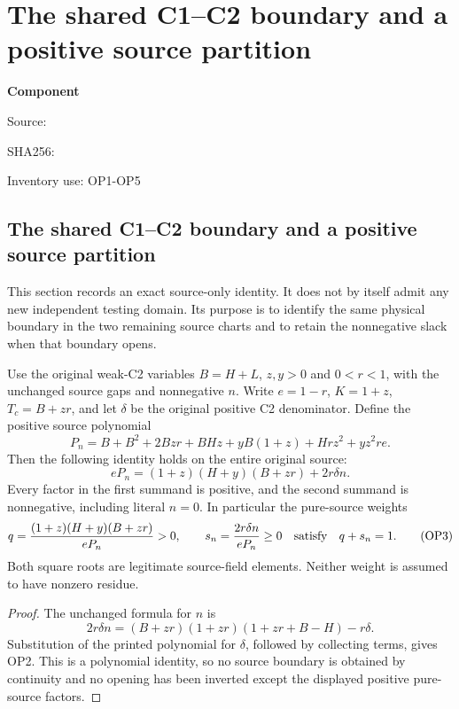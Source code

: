 \chapter{The shared C1--C2 boundary and a positive source partition}
\label{component:pc024f5300388}
\noindent\textbf{Component }\par
{\small\noindent Source: \par}
{\small\noindent SHA256: \par}
{\small\noindent Inventory use: OP1-OP5\par}
\medskip
\section{The shared C1--C2 boundary and a positive source partition}
\label{pc024f5300388:sec:r13-source-overlap}

This section records an exact source-only identity. It does not by itself
admit any new independent testing domain. Its purpose is to identify the
same physical boundary in the two remaining source charts and to retain
the nonnegative slack when that boundary opens.

Use the original weak-C2 variables $B=H+L$, $z,y>0$ and $0<r<1$,
with the unchanged source gaps and nonnegative $n$. Write $e=1-r$,
$K=1+z$, $T_c=B+zr$, and let $\delta$ be the original positive
C2 denominator. Define the positive source polynomial
\[
 P_n=B+B^2+2Bzr+BHz+yB(1+z)+Hrz^2+yz^2re.
 \tag{OP1}
\]
Then the following identity holds on the entire original source:
\[
 \boxed{\quad eP_n=(1+z)(H+y)(B+zr)+2r\delta n.\quad}
 \tag{OP2}
\]
Every factor in the first summand is positive, and the second summand
is nonnegative, including literal $n=0$. In particular the pure-source
weights
\[
 q={ (1+z)(H+y)(B+zr)\over eP_n}>0,
 \qquad s_n={2r\delta n\over eP_n}\ge0
 \quad\hbox{satisfy}\quad q+s_n=1.                   \tag{OP3}
\]
Both square roots are legitimate source-field elements. Neither weight
is assumed to have nonzero residue.

\begin{proof}
The unchanged formula for $n$ is
\[
 2r\delta n=(B+zr)(1+zr)(1+zr+B-H)-r\delta.
\]
Substitution of the printed polynomial for $\delta$, followed by
collecting terms, gives OP2. This is a polynomial identity, so no
source boundary is obtained by continuity and no opening has been
inverted except the displayed positive pure-source factors.
\end{proof}

